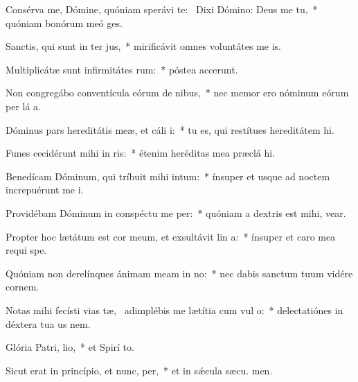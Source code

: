 \item Consérva me, Dómine, quóniam sperávi  te:~\pscross{} Dixi Dómino: Deus me  tu,~* quóniam bonórum meó  ges.
\item Sanctis, qui sunt in ter jus,~* mirificávit omnes voluntátes me  is.
\item Multiplicátæ sunt infirmitátes rum:~* póstea accerunt.
\item Non congregábo conventícula eórum de nibus,~* nec memor ero nóminum eórum per lá a.
\item Dóminus pars hereditátis meæ, et cáli i:~* tu es, qui restítues hereditátem  hi.
\item Funes cecidérunt mihi in ris:~* étenim heréditas mea præclá  hi.
\item Benedícam Dóminum, qui tríbuit mihi intum:~* ínsuper et usque ad noctem increpuérunt me  i.
\item Providébam Dóminum in conspéctu me per:~* quóniam a dextris est mihi,  vear.
\item Propter hoc lætátum est cor meum, et exsultávit lin a:~* ínsuper et caro mea requi  spe.
\item Quóniam non derelínques ánimam meam in no:~* nec dabis sanctum tuum vidére cornem.
\item Notas mihi fecísti vias tæ,~\pscross{} adimplébis me lætítia cum vul o:~* delectatiónes in déxtera tua us  nem.
\item Glória Patri,  lio,~* et Spirí to.
\item Sicut erat in princípio, et nunc,  per,~* et in sǽcula sæcu. men.

